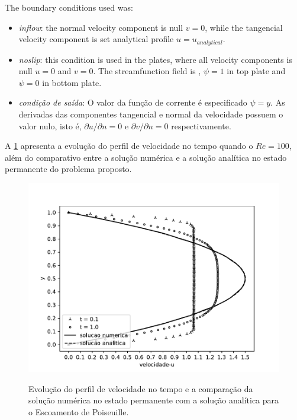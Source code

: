 \medskip
\noindent
The boundary conditions used was:

\begin{itemize}
     \item \textit{inflow}:
      the normal velocity component is null $v=0$, 
      while the tangencial velocity component is set analytical profile
      $u = u_{analytical}$.

     \item \textit{noslip}: this condition is used in the plates,
      where all velocity components is null $u=0$ and $v=0$.
      The streamfunction field is ,  
$\psi=1$ in top plate and
$\psi=0$ in bottom plate.

     \item \textit{condição de saída}: O valor da função de corrente é especificado $\psi=y$. As derivadas das
     componentes tangencial e normal da velocidade possuem o 
     valor nulo, isto é,
      $\partial u/\partial n = 0$ e
      $\partial v/\partial n = 0$ respectivamente.
\end{itemize}


\medskip
A \ref{velocidade poiseuille} apresenta a evolução 
do perfil de velocidade no tempo quando o $Re=100$, além do comparativo
entre a solução numérica e a solução analítica no estado permanente do
problema proposto. 


\begin{figure}[H]
     \centering
     \includegraphics[scale=1]{./02_chaps/cap_validation/figure/poiseuille_velocity.pdf}\\
     \medskip
     \caption{Evolução do perfil de velocidade no tempo e
     a comparação da solução numérica no estado permanente com a solução analítica para o Escoamento de Poiseuille.}
     \label{velocidade poiseuille}
\end{figure}

